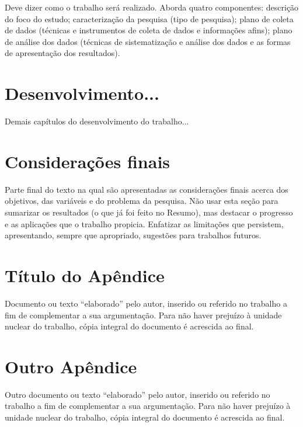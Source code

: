 \documentclass{ifto-tex}
\begin{document}
	Deve dizer como o trabalho será realizado. Aborda quatro componentes: descrição do foco do estudo; caracterização da pesquisa (tipo de pesquisa); plano de coleta de dados (técnicas e instrumentos de coleta de dados e informações afins); plano de análise dos dados (técnicas de sistematização e análise dos dados e as formas de apresentação dos resultados).
	
\chapter{Desenvolvimento...}
	
	Demais capítulos do desenvolvimento do trabalho...

\chapter{Considerações finais}

	Parte final do texto na qual são apresentadas as considerações finais acerca dos objetivos, das variáveis e do problema da pesquisa. Não usar esta seção para sumarizar os resultados (o que já foi feito no Resumo), mas destacar o progresso e as aplicações que o trabalho propicia. Enfatizar as limitações que persistem, apresentando, sempre que apropriado, sugestões para trabalhos futuros.



\postextual



\begin{apendicesenv}
	
	\partapendices
	
	\chapter{Título do Apêndice}
	
		Documento ou texto “elaborado” pelo autor, inserido ou referido no trabalho a fim de complementar a sua argumentação. Para	não haver prejuízo à unidade nuclear do	trabalho, cópia integral do documento é	acrescida ao final.
		
	\chapter{Outro Apêndice}
	
		Outro documento ou texto “elaborado” pelo autor, inserido ou referido no trabalho a fim de complementar a sua argumentação. Para	não haver prejuízo à unidade nuclear do	trabalho, cópia integral do documento é	acrescida ao final.
	
	
\end{apendicesenv}
\end{document}
